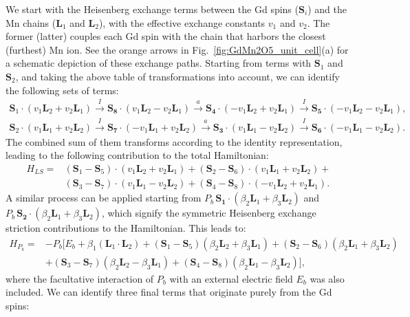 We start with the Heisenberg exchange terms between the Gd spins ($\bm{S}_i$) and the Mn chains ($\bm{L}_1$ and $\bm{L}_2$), with the effective exchange constants $v_1$ and $v_2$.
The former (latter) couples each Gd spin with the chain that harbors the closest (furthest) Mn ion. See the orange arrows in Fig.~\ref{fig:GdMn2O5_unit_cell}(a) for a schematic depiction of these exchange paths.
Starting from terms with $\bm{S}_1$ and $\bm{S}_2$, and taking the above table of transformations into account, we can identify the following sets of terms:
\begin{align}
	\bm{S}_1\cdot(v_1 \bm{L}_2 + v_2 \bm{L}_1) \xrightarrow{I} \bm{S_8}\cdot(v_1 \bm{L}_2 - v_2 \bm{L}_1) \xrightarrow{a} \bm{S_4} \cdot (- v_1 \bm{L}_2 + v_2 \bm{L}_1) \xrightarrow{I} \bm{S_5} \cdot (-v_1 \bm{L}_2 - v_2 \bm{L}_1), \nonumber\\
	\bm{S}_2\cdot(v_1 \bm{L}_1 + v_2 \bm{L}_2) \xrightarrow{I} \bm{S_7}\cdot(-v_1 \bm{L}_1 + v_2 \bm{L}_2) \xrightarrow{a} \bm{S_3} \cdot (v_1 \bm{L}_1 - v_2 \bm{L}_2) \xrightarrow{I} \bm{S_6} \cdot (-v_1 \bm{L}_1 - v_2 \bm{L}_2).
\end{align}
The combined sum of them transforms according to the identity representation, leading to the following contribution to the total Hamiltonian:
\begin{align}
    H_{LS} =& (\bm{S}_1 - \bm{S}_5) \cdot (v_1 \bm{L}_2 + v_2 \bm{L}_1) + (\bm{S}_2 - \bm{S}_6) \cdot (v_1 \bm{L}_1 + v_2 \bm{L}_2) + \nonumber \\ &(\bm{S}_3 - \bm{S}_7) \cdot (v_1 \bm{L}_1 - v_2 \bm{L}_2) + (\bm{S}_4 - \bm{S}_8) \cdot (-v_1 \bm{L}_2 + v_2 \bm{L}_1).
\end{align}
A similar process can be applied starting from $P_b \, \bm{S_1}\cdot(\beta_2 \bm{L}_1 + \beta_3 \bm{L}_2)$ and $P_b\, \bm{S_2}\cdot(\beta_2 \bm{L}_1 + \beta_3 \bm{L}_2)$, which signify the symmetric Heisenberg exchange striction contributions to the Hamiltonian. This leads to:
\begin{align}
	H_{P_b}=&-P_b[E_b + \beta_1 (\bm{L}_1\cdot \bm{L}_2)+
    (\bm{S}_1-\bm{S}_5)(\beta_2 \bm{L}_2 + \beta_3 \bm{L}_1) +
    (\bm{S}_2-\bm{S}_6)(\beta_2 \bm{L}_1 + \beta_3 \bm{L}_2) \nonumber\\ 
    &+(\bm{S}_3-\bm{S}_7)(\beta_2 \bm{L}_2 - \beta_3 \bm{L}_1) +
    (\bm{S}_4-\bm{S}_8)(\beta_2 \bm{L}_1 - \beta_3 \bm{L}_2)],
\end{align}
where the facultative interaction of $P_b$ with an external electric field $E_b$ was also included. 
We can identify three final terms that originate purely from the Gd spins:
